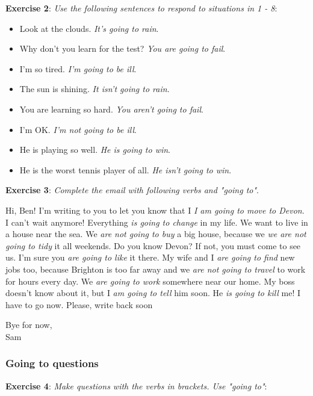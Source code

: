 \textbf{Exercise 2}: \textit{Use the following sentences to respond to situations in 1 - 8}:

\begin{itemize}

\item Look at the clouds. \textit{It's going to rain}.
\item Why don't you learn for the test? \textit{You are going to fail}.
\item I'm so tired. \textit{I'm going to be ill}.
\item The sun is shining. \textit{It isn't going to rain}.
\item You are learning so hard. \textit{You aren't going to fail}.
\item I'm OK. \textit{I'm not going to be ill}.
\item He is playing so well. \textit{He is going to win}.
\item He is the worst tennis player of all. \textit{He isn't going to win}.

\end{itemize}

\textbf{Exercise 3}: \textit{Complete the email with following verbs and "going to"}.

Hi, Ben!
I'm writing to you to let you know that I \textit{I am going to move to Devon}. I can't wait 
anymore! Everything \textit{is going to change} in my life. We want to live in a house 
near the sea. We \textit{are not going to buy} a big house, because we \textit{we are not going to tidy} it all weekends. Do you know Devon? If not, you must come to see us. I'm sure you \textit{are going to like} it there. My wife and I \textit{are going to find} new jobs too, because Brighton is too far away 
and we \textit{are not going to travel} to work for hours every day. We \textit{are going to work} somewhere near our home. My boss doesn't know about it, but I \textit{am going to tell} him soon. He \textit{is going to kill} me!
I have to go now. Please, write back soon

\begin{flushleft}
Bye for now,\\
Sam
\end{flushleft}

\subsubsection{Going to questions}

\textbf{Exercise 4}: \textit{Make questions with the verbs in brackets. Use "going to"}:

